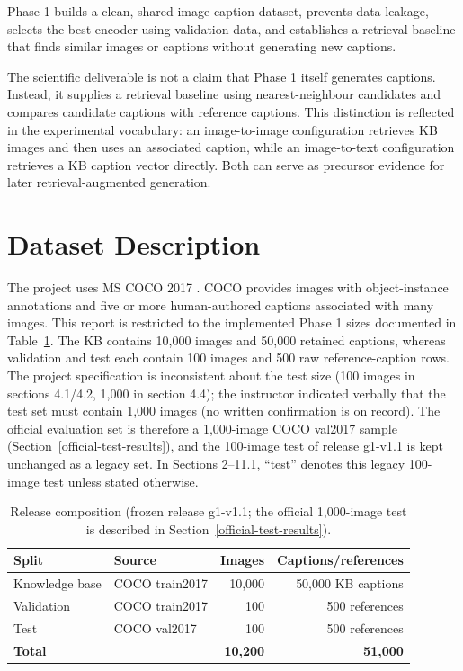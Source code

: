 \documentclass{article}
\begin{document}
Phase 1 builds a clean, shared image-caption dataset, prevents data leakage, selects the best encoder using validation data, and establishes a retrieval baseline that finds similar images or captions without generating new captions.

The scientific deliverable is not a claim that Phase 1 itself generates
captions. Instead, it supplies a retrieval baseline using
nearest-neighbour candidates and compares candidate captions with
reference captions. This distinction is reflected in the experimental
vocabulary: an image-to-image configuration retrieves KB images and then
uses an associated caption, while an image-to-text configuration
retrieves a KB caption vector directly. Both can serve as precursor
evidence for later retrieval-augmented generation.


\section{Dataset Description}\label{dataset-description}

The project uses MS COCO 2017 \cite{fleet_microsoft_2014}. COCO provides images with object-instance
annotations and five or more human-authored captions associated with
many images. This report is restricted to the implemented Phase 1
sizes documented in Table~\ref{tab:release-composition}. The
KB contains 10,000 images and 50,000 retained captions, whereas
validation and test each contain 100 images and 500 raw
reference-caption rows. The project specification is inconsistent about the
test size (100 images in sections 4.1/4.2, 1,000 in section 4.4); the
instructor indicated verbally that the test set must contain 1,000 images
(no written confirmation is on record). The official evaluation set is
therefore a 1,000-image COCO val2017 sample (Section~\ref{official-test-results}),
and the 100-image test of release g1-v1.1 is kept unchanged as a legacy set.
In Sections 2--11.1, ``test'' denotes this legacy 100-image test unless stated otherwise.

\begin{table}[H]
\centering
\caption{Release composition (frozen release g1-v1.1; the official 1,000-image test is described in Section~\ref{official-test-results}).}
\label{tab:release-composition}
\begin{tabular}{llrr}
\toprule
Split & Source & Images & Captions/references \\
\midrule
Knowledge base & COCO train2017 & 10,000 & 50,000 KB captions \\
Validation & COCO train2017 & 100 & 500 references \\
Test & COCO val2017 & 100 & 500 references \\
\midrule
\textbf{Total} & & \textbf{10,200} & \textbf{51,000} \\
\bottomrule
\end{tabular}
\end{table}
\end{document}
